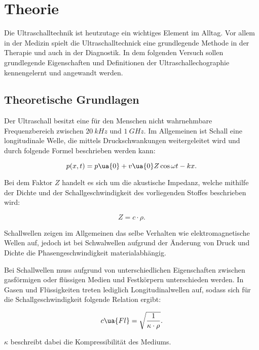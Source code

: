 \section{Theorie}

Die Ultraschalltechnik ist heutzutage ein wichtiges Element im Alltag.
Vor allem in der Medizin spielt die Ultraschalltechnick eine grundlegende Methode in der Therapie
und auch in der Diagnostik. In dem folgenden Versuch sollen grundlegende
Eigenschaften und Definitionen der Ultraschallechographie kennengelernt und
angewandt werden.

\subsection{Theoretische Grundlagen}

Der Ultraschall besitzt eine für den Menschen nicht wahrnehmbare Frequenzbereich
zwischen $\SI{20}{kHz}$ und $\SI{1}{GHz}$. Im Allgemeinen ist Schall eine
longitudinale Welle, die mittels Druckschwankungen weitergeleitet wird und durch
folgende Formel beschrieben werden kann:

\begin{equation}
  p(x,t) = p\ua{0} + v\ua{0}Z\cos{\omega t - kx} .
  \label{eqn:Druckwelle}
\end{equation}

Bei dem Faktor $Z$ handelt es sich um die akustische Impedanz, welche mithilfe der
Dichte und der Schallgeschwindigkeit des vorliegenden Stoffes beschrieben wird:

\begin{equation}
  Z = c \cdot \rho .
  \label{eqn:Impedanz}
\end{equation}

Schallwellen zeigen im Allgemeinen das selbe Verhalten wie elektromagnetische Wellen auf,
jedoch ist bei Schwalwellen aufgrund der Änderung von Druck und Dichte die
Phasengeschwindigkeit materialabhängig.

Bei Schallwellen muss aufgrund von unterschiedlichen Eigenschaften zwischen
gasförmigen oder flüssigen Medien und Festkörpern unterschieden werden. In Gasen und
Flüssigkeiten treten lediglich Longitudinalwellen auf, sodass sich für die
Schallgeschwindigkeit folgende Relation ergibt:

\begin{equation}
  c\ua{Fl} = \sqrt{ \frac{1}{\kappa \cdot \rho} }.
  \label{eqn:C_Fl}
\end{equation}

$\kappa$ beschreibt dabei die Kompressibilität des Mediums.

